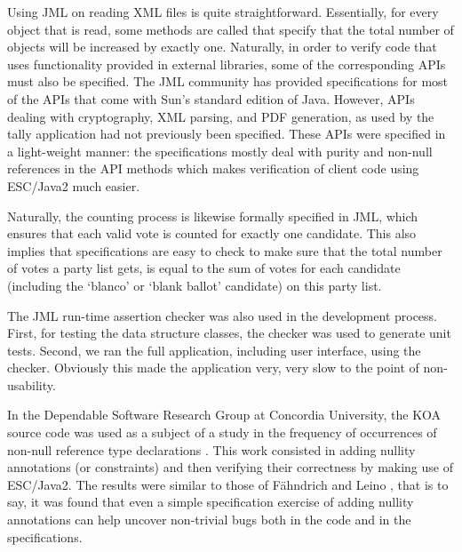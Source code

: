 \documentclass[times, 10pt, twocolumn]{article}
\begin{document}
Using JML on reading XML files is quite straightforward. Essentially, for every 
object that is read, some methods are called that specify that the total number 
of objects will be increased by exactly one. Naturally, in order to verify code 
that uses functionality provided in external libraries, some of the 
corresponding APIs must also be specified. The JML community has provided 
specifications for most of the APIs that come with Sun's standard edition of 
Java. However, APIs dealing with cryptography, XML parsing, and PDF generation, 
as used by the tally application had not previously been specified. These APIs 
were specified in a light-weight manner: the specifications mostly deal with 
purity and non-null references in the API methods which makes verification of 
client code using ESC/Java2 much easier.

Naturally, the counting process is likewise formally specified in JML, which  
ensures that each valid vote is counted for exactly one candidate. This also 
implies that specifications are easy to check to make sure that the total 
number of votes a party list gets, is equal to the sum of votes for each 
candidate (including the `blanco' or `blank ballot' candidate) on this party
list.

The JML run-time assertion checker was also used in the development process. 
First, for testing the data structure classes, the checker was used to generate 
unit tests. Second, we ran the full application, including user interface, 
using the checker. Obviously this made the application very, very slow to the 
point of non-usability.


In the Dependable Software Research Group at Concordia University, the KOA 
source code was used as a subject of a study in the frequency of occurrences of 
non-null reference type declarations \cite{ChalinRioux05}. This work consisted 
in adding nullity annotations (or constraints) and then verifying their 
correctness by making use of ESC/Java2.  The results were similar to those of 
F{\"a}hndrich and Leino \cite{fahndrich03declaring}, that is to say, it was 
found that even a simple specification exercise of adding nullity annotations 
can help uncover non-trivial bugs both in the code and in the specifications.
\end{document}
